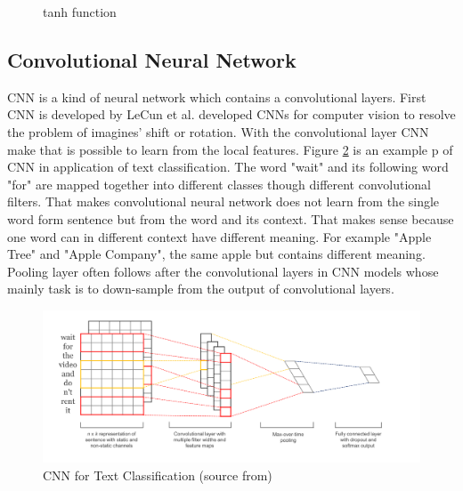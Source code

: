 \label{sec:NNsec}
 \begin{figure}
\center
{}
   \caption{tanh function}
\label{fig:tanh}
\end{figure}
\newpage
 \subsection{Convolutional Neural Network} %
CNN is a kind of neural network which contains a convolutional layers. First CNN is developed by LeCun et al. developed CNNs \cite{lecun1989backpropagation} for computer vision to resolve the problem of imagines' shift or rotation. With the convolutional layer CNN make that is possible to learn from the local features. Figure \ref{fig:cnn2} is an example p of CNN in application of text classification. The word "wait" and its following word "for" are mapped together into different classes though different convolutional filters. That makes convolutional neural network does not learn from the single word form sentence but from the word and its context. That makes sense because one word can in different context have different meaning. For example "Apple Tree" and "Apple Company", the same apple but contains different meaning. 
 Pooling layer often follows after the convolutional layers in CNN models whose mainly task is to down-sample from the output of convolutional layers.  
   


 \begin{figure}[!h]
\centering
\includegraphics[width=1\columnwidth]{images/CNN.png}
\caption{CNN for Text Classification (source from\cite{kim2014convolutional}) }
\label{fig:cnn2}
\end{figure}



